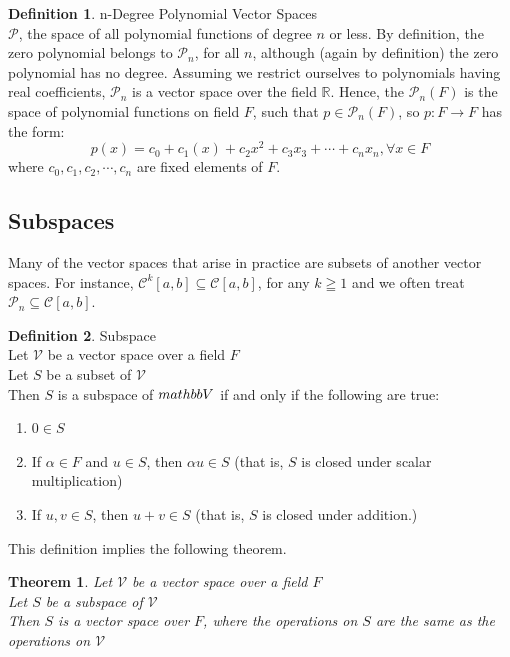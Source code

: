\documentclass{book}
\newtheorem{theorem}{Theorem}[section]
\theoremstyle{definition}
\newtheorem{definition}{Definition}[section]
\theoremstyle{remark}
\newcommand{\bb}[1]{\mathbb{#1}}
\begin{document}
\begin{definition}
n-Degree Polynomial Vector Spaces \\

    $\mathcal{P}$, the space of all polynomial functions of degree $n$ or less. By definition, the zero polynomial belongs to $\mathcal{P}_n$, for all $n$, although (again by definition) the zero polynomial has no degree. Assuming we restrict ourselves to polynomials having real coefficients, $\mathcal{P}_n$ is a vector space over the field $\bb{R}$. Hence, the $\mathcal{P}_n(F)$ is the space of polynomial functions on field $F$, such that $p \in \mathcal{P}_n(F)$, so $p: F \to F$ has the form: 
        \begin{equation*}
            p(x) = c_0 + c_1(x) +c_2x^2 + c_3x_3 + \cdots + c_nx_n, \forall x \in F
        \end{equation*}
    where $c_0, c_1, c_2, \cdots, c_n$ are fixed elements of $F$.
\end{definition}

\newpage
\subsection{Subspaces}

Many of the vector spaces that arise in practice are subsets of another vector spaces. For instance, $\mathcal{C}^k[a,b] \subseteq \mathcal{C}[a,b]$, for any $k \geqq 1$ and we often treat $\mathcal{P}_n \subseteq \mathcal{C}[a,b]$. 

\begin{definition}
Subspace \\

    Let $\mathcal{V}$ be a vector space over a field $F$ \\
    Let $S$ be a subset of $\mathcal{V}$ \\
    Then $S$ is a subspace of $\\mathbb{V}$ if and only if the following are true: 
        \begin{enumerate}
            \item $0 \in S$
            \item If $\alpha \in F$ and $u \in S$, then $\alpha u \in S$ (that is, $S$ is closed under scalar multiplication)
            \item If $u, v \in S$, then $u+v \in S$ (that is, $S$ is closed under addition.)
        \end{enumerate}

    This definition implies the following theorem. 

    \begin{tcolorbox}
        \begin{theorem}
            Let $\mathcal{V}$ be a vector space over a field $F$ \\
            Let $S$ be a subspace of $\mathcal{V}$ \\
            Then $S$ is a vector space over $F$, where the operations on $S$ are the same as the operations on $\mathcal{V}$
        \end{theorem}
    \end{tcolorbox}
\end{definition}
\end{document}
